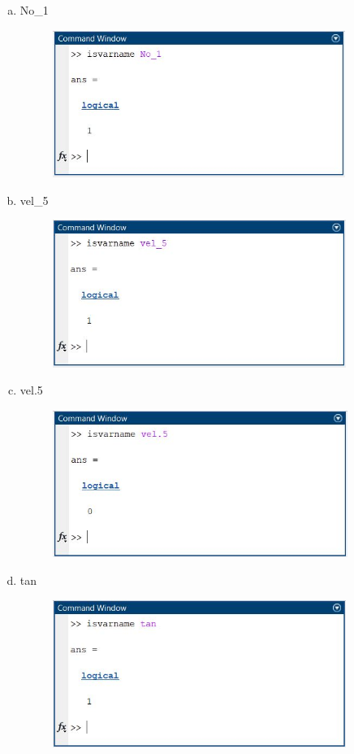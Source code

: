 \documentclass{article}
\begin{document}
\begin{enumerate}[a)]
\begin{figure}[H]
        \end{figure}
    \item No\_1
        \begin{figure}[H]
        \centering
        \includegraphics[height=4.8cm]{img6s.jpg}
        \end{figure}
    \item vel\_5
        \begin{figure}[H]
        \centering
        \includegraphics[height=4.8cm]{img6t.jpg}
        \end{figure}
    \item vel.5
        \begin{figure}[H]
        \centering
        \includegraphics[height=4.8cm]{img6u.jpg}
        \end{figure}
    \item tan
        \begin{figure}[H]
        \centering
        \includegraphics[height=4.8cm]{img6v.jpg}

\end{figure}
\end{enumerate}
\end{document}
